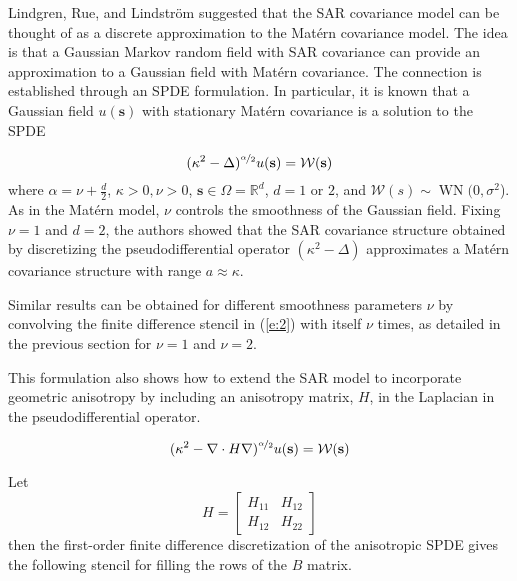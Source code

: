 \documentclass[review]{elsarticle}
\begin{document}
Lindgren, Rue, and Lindstr{\"o}m \cite{lindgren2011explicit} suggested that the SAR covariance model can be thought of as a discrete approximation to the Mat\'ern covariance model. The idea is that a Gaussian Markov random field with SAR covariance can provide an approximation to a Gaussian field with Mat\'ern covariance. The connection is established through an SPDE formulation. In particular, it is known that a Gaussian field $u(\mathbf s)$ with stationary Mat\'ern covariance is a solution to the SPDE

$$ (\kappa^2 - \Delta)^{\nicefrac{\alpha}{2}} u(\mathbf s) = \mathcal{W}(\mathbf s) $$
where $\alpha = \nu + \frac{d}{2}$, $\kappa > 0, \nu > 0$, $\mathbf s \in \Omega = \mathbb{R}^d$, $d = 1$ or $2$, and $\mathcal{W}(s) \sim \operatorname{WN}(0, \sigma^2$). As in the Mat\'ern model, $\nu$ controls the smoothness of the Gaussian field. Fixing $\nu = 1$ and $d = 2$, the authors showed that the SAR covariance structure obtained by discretizing the pseudodifferential operator $(\kappa^2 - \Delta)$ approximates a Mat\'ern covariance structure with range $a \approx \kappa$. 

Similar results can be obtained for different smoothness parameters $\nu$ by convolving the finite difference stencil in (\ref{e:2}) with itself $\nu$ times, as detailed in the previous section for $\nu=1$ and $\nu=2$.

This formulation also shows how to extend the SAR model to incorporate geometric anisotropy by including an anisotropy matrix, $H$, in the Laplacian in the pseudodifferential operator.

\begin{equation}
\label{SPDE}
 (\kappa^2 - \nabla \cdot H \nabla)^{\nicefrac{\alpha}{2}} u(\mathbf s) = \mathcal{W}(\mathbf s) 
 \end{equation} 

Let 
\[ H = \begin{bmatrix} H_{11} & H_{12} \\
                        H_{12} & H_{22}
        \end{bmatrix} \]
then the first-order finite difference discretization of the anisotropic SPDE gives the following stencil for filling the rows of the $B$ matrix.
\end{document}
